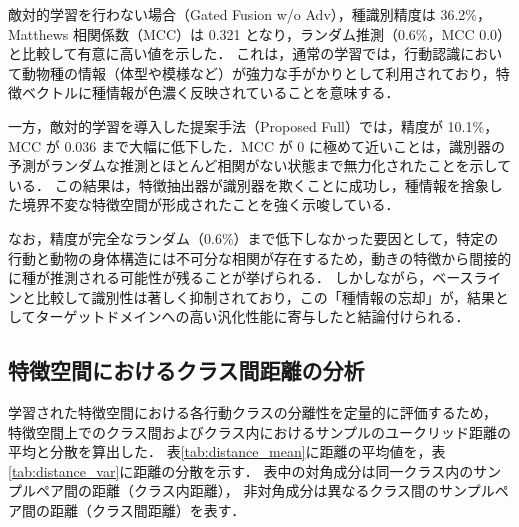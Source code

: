 敵対的学習を行わない場合（Gated Fusion w/o Adv），種識別精度は 36.2\%，Matthews 相関係数（MCC）は 0.321 となり，ランダム推測（0.6\%，MCC 0.0）と比較して有意に高い値を示した．
これは，通常の学習では，行動認識において動物種の情報（体型や模様など）が強力な手がかりとして利用されており，特徴ベクトルに種情報が色濃く反映されていることを意味する．

一方，敵対的学習を導入した提案手法（Proposed Full）では，精度が 10.1\%，MCC が 0.036 まで大幅に低下した．MCC が 0 に極めて近いことは，識別器の予測がランダムな推測とほとんど相関がない状態まで無力化されたことを示している．
この結果は，特徴抽出器が識別器を欺くことに成功し，種情報を捨象した境界不変な特徴空間が形成されたことを強く示唆している．

なお，精度が完全なランダム（0.6\%）まで低下しなかった要因として，特定の行動と動物の身体構造には不可分な相関が存在するため，動きの特徴から間接的に種が推測される可能性が残ることが挙げられる．
しかしながら，ベースラインと比較して識別性は著しく抑制されており，この「種情報の忘却」が，結果としてターゲットドメインへの高い汎化性能に寄与したと結論付けられる．


\subsection{特徴空間におけるクラス間距離の分析}

学習された特徴空間における各行動クラスの分離性を定量的に評価するため，
特徴空間上でのクラス間およびクラス内におけるサンプルのユークリッド距離の平均と分散を算出した．
表\ref{tab:distance_mean}に距離の平均値を，表\ref{tab:distance_var}に距離の分散を示す．
表中の対角成分は同一クラス内のサンプルペア間の距離（クラス内距離），
非対角成分は異なるクラス間のサンプルペア間の距離（クラス間距離）を表す．

\begin{table}[t]
  \centering
  \caption{各行動クラス間の特徴空間上での距離平均（対角成分はクラス内距離）}
  \label{tab:distance_mean}
\end{table}

